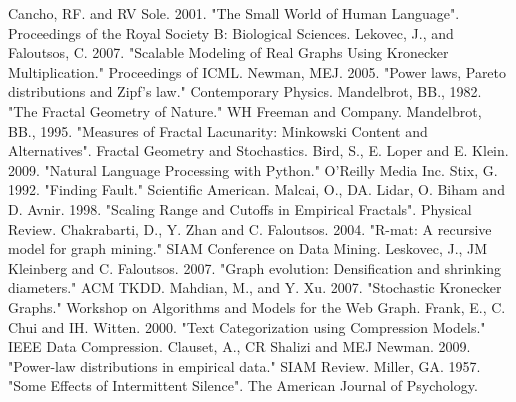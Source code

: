 \documentclass[12pt]{article}
\begin{document}

\begin{thebibliography}{99}
    Cancho, RF. and RV Sole. 2001. "The Small World of Human Language". Proceedings of the Royal Society B: Biological Sciences.
    Lekovec, J., and Faloutsos, C. 2007. "Scalable Modeling of Real Graphs Using Kronecker Multiplication." Proceedings of ICML.
    Newman, MEJ. 2005. "Power laws, Pareto distributions and Zipf's law." Contemporary Physics.
    Mandelbrot, BB., 1982. "The Fractal Geometry of Nature." WH Freeman and Company.
    Mandelbrot, BB., 1995. "Measures of Fractal Lacunarity: Minkowski Content and Alternatives". Fractal Geometry and Stochastics.
    Bird, S., E. Loper and E. Klein. 2009. "Natural Language Processing with Python." O'Reilly Media Inc.
    Stix, G. 1992. "Finding Fault." Scientific American.
    Malcai, O., DA. Lidar, O. Biham and D. Avnir. 1998. "Scaling Range and Cutoffs in Empirical Fractals". Physical Review.
    Chakrabarti, D., Y. Zhan and C. Faloutsos. 2004. "R-mat: A recursive model for graph mining." SIAM Conference on Data Mining.
    Leskovec, J., JM Kleinberg and C. Faloutsos. 2007. "Graph evolution: Densification and shrinking diameters." ACM TKDD.
    Mahdian, M., and Y. Xu. 2007. "Stochastic Kronecker Graphs." Workshop on Algorithms and Models for the Web Graph.
    Frank, E., C. Chui and IH. Witten. 2000. "Text Categorization using Compression Models." IEEE Data Compression.
    Clauset, A., CR Shalizi and MEJ Newman. 2009. "Power-law distributions in empirical data." SIAM Review.
    Miller, GA. 1957. "Some Effects of Intermittent Silence". The American Journal of Psychology.
\end{thebibliography}
\end{document}
